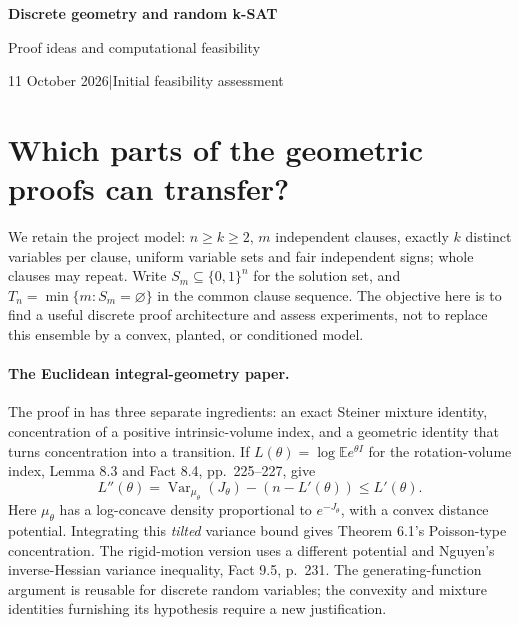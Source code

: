 \documentclass[11pt,a4paper]{article}
\newcommand{\ReportTitle}{Discrete geometry and random k-SAT}
\newcommand{\ReportSubtitle}{Proof ideas and computational feasibility}
\begin{document}
\begin{center}
 {\Large\bfseries\color{ink}\ReportTitle\par}
 \vspace{3mm}
 {\large\ReportSubtitle\par}
 \vspace{2mm}
 {\small 11 October 2026\quad |\quad Initial feasibility assessment}
\end{center}

\section{Which parts of the geometric proofs can transfer?}
We retain the project model: $n\ge k\ge2$, $m$ independent clauses, exactly
$k$ distinct variables per clause, uniform variable sets and fair independent
signs; whole clauses may repeat. Write $S_m\subseteq\{0,1\}^n$ for the
solution set, and $T_n=\min\{m:S_m=\varnothing\}$ in the common clause
sequence. The objective here is to find a useful discrete proof architecture
and assess experiments, not to replace this ensemble by a convex, planted,
or conditioned model.

\paragraph{The Euclidean integral-geometry paper.}
The proof in \citet[Sections 6--9]{lotz2026} has three separate ingredients:
an exact Steiner mixture identity, concentration of a positive
intrinsic-volume index, and a geometric identity that turns concentration
into a transition. If $L(\theta)=\log\mathbb E e^{\theta I}$ for the
rotation-volume index, Lemma 8.3 and Fact 8.4, pp.~225--227, give
\[
 L''(\theta)=\operatorname{Var}_{\mu_\theta}(J_\theta)
              -(n-L'(\theta))\le L'(\theta).
\]
Here $\mu_\theta$ has a log-concave density proportional to
$e^{-J_\theta}$, with a convex distance potential. Integrating this
\emph{tilted} variance bound gives Theorem 6.1's Poisson-type concentration.
The rigid-motion version uses a different potential and Nguyen's
inverse-Hessian variance inequality, Fact 9.5, p.~231. The generating-function
argument is reusable for discrete random variables; the convexity and
mixture identities furnishing its hypothesis require a new justification.
\end{document}
